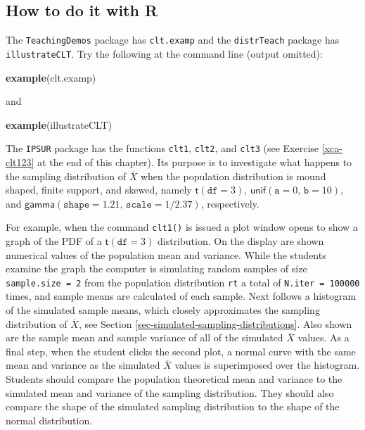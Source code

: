 \documentclass[]{book}
\newenvironment{Shaded}{\begin{snugshade}}{\end{snugshade}}
\newcommand{\KeywordTok}[1]{\textcolor[rgb]{0.13,0.29,0.53}{\textbf{{#1}}}}
\newcommand{\NormalTok}[1]{{#1}}
\numberwithin{equation}{chapter}
\numberwithin{figure}{chapter}
\theoremstyle{plain}
\theoremstyle{definition}
\theoremstyle{remark}
\theoremstyle{definition}
\theoremstyle{definition}
\theoremstyle{remark}
\begin{document}
\subsection{How to do it with R}\label{how-to-do-it-with-r-32}

The \texttt{TeachingDemos} package \autocite{TeachingDemos} has
\texttt{clt.examp} and the \texttt{distrTeach} \autocite{distrTeach}
package has \texttt{illustrateCLT}. Try the following at the command
line (output omitted):

\begin{Shaded}
\begin{Highlighting}[]
\KeywordTok{example}\NormalTok{(clt.examp)}
\end{Highlighting}
\end{Shaded}

and

\begin{Shaded}
\begin{Highlighting}[]
\KeywordTok{example}\NormalTok{(illustrateCLT)}
\end{Highlighting}
\end{Shaded}

The \texttt{IPSUR} package \autocite{IPSUR} has the functions
\texttt{clt1}, \texttt{clt2}, and \texttt{clt3} (see Exercise
\ref{xca-clt123} at the end of this chapter). Its purpose is to
investigate what happens to the sampling distribution of
\(\overline{X}\) when the population distribution is mound shaped,
finite support, and skewed, namely \(\mathsf{t}(\mathtt{df}=3)\),
\(\mathsf{unif}(\mathtt{a}=0,\,\mathtt{b}=10)\), and
\(\mathsf{gamma}(\mathtt{shape}=1.21,\,\mathtt{scale}=1/2.37)\),
respectively.

For example, when the command \texttt{clt1()} is issued a plot window
opens to show a graph of the PDF of a \(\mathsf{t}(\mathtt{df}=3)\)
distribution. On the display are shown numerical values of the
population mean and variance. While the students examine the graph the
computer is simulating random samples of size \texttt{sample.size\ =\ 2}
from the population distribution \texttt{rt} a total of
\texttt{N.iter\ =\ 100000} times, and sample means are calculated of
each sample. Next follows a histogram of the simulated sample means,
which closely approximates the sampling distribution of
\(\overline{X}\), see Section
\ref{sec-simulated-sampling-distributions}. Also shown are the sample
mean and sample variance of all of the simulated \(\overline{X}\)
values. As a final step, when the student clicks the second plot, a
normal curve with the same mean and variance as the simulated
\(\overline{X}\) values is superimposed over the histogram. Students
should compare the population theoretical mean and variance to the
simulated mean and variance of the sampling distribution. They should
also compare the shape of the simulated sampling distribution to the
shape of the normal distribution.
\end{document}
